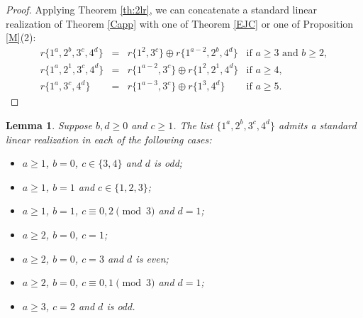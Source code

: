 \documentclass{amsart}
\newtheorem{lem}[prop]{Lemma}
\theoremstyle{definition}
\numberwithin{equation}{section}
\def\ol{\oplus}
\begin{document}
\begin{proof}
Applying Theorem \ref{th:2lr}, we can concatenate a standard linear realization of Theorem \ref{Capp} with one of Theorem \ref{EJC} or one of Proposition \ref{M}(2):
$$\begin{array}{rcll}
r\{1^a,2^b,3^c,4^d\}  &=& r\{1^2,3^c\}\ol r\{1^{a-2},2^b,4^d\} & \textrm{if } a\geq 3 \textrm{ and } b\geq 2,\\
r\{1^a, 2^1, 3^c, 4^d\}  & = & r\{1^{a-2}, 3^c \}\ol r\{1^2,2^1,4^d\}& \textrm{if } a\geq 4,\\
r\{1^a, 3^c, 4^d\}  & = & r\{1^{a-3},3^c \}\ol r\{1^3, 4^d\} & \textrm{if } a\geq 5.
\end{array}$$
\end{proof}

\begin{lem}\label{6}
Suppose $b,d\geq 0$ and $c\geq 1$.
The list $\{1^a, 2^b, 3^c, 4^d\}$ admits a standard linear realization in each of the following cases:
\begin{itemize}
\item[(1)] $a\geq 1$, $b=0$, $c\in \{3,4\}$ and $d$ is odd;
\item[(2)] $a\geq 1$, $b=1$ and $c\in \{1,2,3\}$;
\item[(3)] $a\geq 1$, $b=1$, $c\equiv 0,2 \pmod 3$ and $d=1$;
\item[(4)] $a\geq 2$, $b=0$, $c=1$;
\item[(5)] $a\geq 2$, $b=0$, $c=3$ and $d$ is even;
\item[(6)] $a\geq 2$, $b=0$, $c\equiv 0,1 \pmod 3$ and $d=1$;
\item[(7)] $a\geq 3$, $c=2$ and $d$ is odd.
\end{itemize}
\end{lem}
\end{document}
